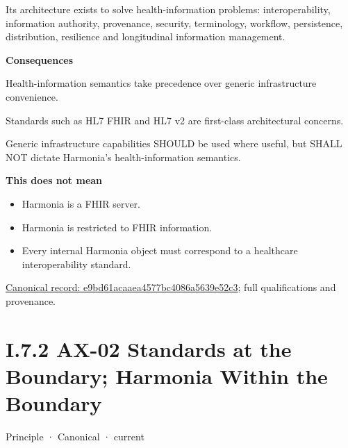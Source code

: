 Its architecture exists to solve health-information problems:
interoperability, information authority, provenance, security,
terminology, workflow, persistence, distribution, resilience and
longitudinal information management.



\par\medskip\textbf{Consequences}\par


Health-information semantics take precedence over generic infrastructure
convenience.



Standards such as HL7 FHIR and HL7 v2 are first-class architectural
concerns.



Generic infrastructure capabilities SHOULD be used where useful, but
SHALL NOT dictate Harmonia's health-information semantics.



\textbf{This does not mean}



\begin{itemize}


\item Harmonia is a FHIR server.

\item Harmonia is restricted to FHIR information.

\item Every internal Harmonia object must correspond to a healthcare interoperability standard.

\end{itemize}

{\footnotesize \href{../../../../continuum/motivation/principle/e9bd61acaaea4577bc4086a5639e52c3.md}{Canonical record: e9bd61acaaea4577bc4086a5639e52c3}; full qualifications and provenance.}\par
\section*{I.7.2 AX-02 Standards at the Boundary; Harmonia Within the Boundary}
\label{navigation:I.7.2}

\label{element:eee8c3783d964d18a7f9dcea85fcd4cf}
{\small Principle · Canonical · current}\par

